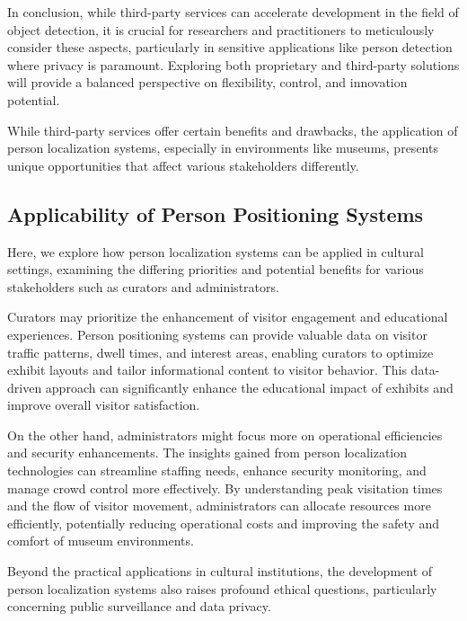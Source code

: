 In conclusion, while third-party services can accelerate development in the field of object detection, it is crucial for researchers and practitioners to meticulously consider these aspects, particularly in sensitive applications like person detection where privacy is paramount. Exploring both proprietary and third-party solutions will provide a balanced perspective on flexibility, control, and innovation potential.

While third-party services offer certain benefits and drawbacks, the application of person localization systems, especially in environments like museums, presents unique opportunities that affect various stakeholders differently.

\subsection{Applicability of Person Positioning Systems}
\label{sec:applicability_person_localization}
Here, we explore how person localization systems can be applied in cultural settings, examining the differing priorities and potential benefits for various stakeholders such as curators and administrators. 

Curators may prioritize the enhancement of visitor engagement and educational experiences. Person positioning systems can provide valuable data on visitor traffic patterns, dwell times, and interest areas, enabling curators to optimize exhibit layouts and tailor informational content to visitor behavior. This data-driven approach can significantly enhance the educational impact of exhibits and improve overall visitor satisfaction.

On the other hand, administrators might focus more on operational efficiencies and security enhancements. The insights gained from person localization technologies can streamline staffing needs, enhance security monitoring, and manage crowd control more effectively. By understanding peak visitation times and the flow of visitor movement, administrators can allocate resources more efficiently, potentially reducing operational costs and improving the safety and comfort of museum environments.

Beyond the practical applications in cultural institutions, the development of person localization systems also raises profound ethical questions, particularly concerning public surveillance and data privacy.

